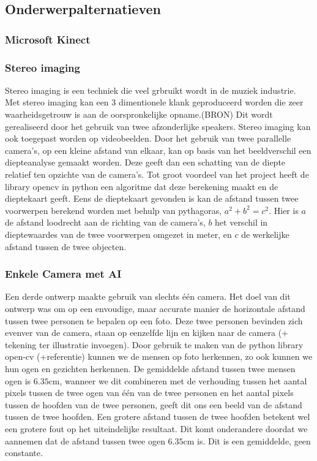 \documentclass[a4paper,11pt]{article}
\begin{document}
	\subsection{Onderwerpalternatieven}
	\subsubsection{Microsoft Kinect}
	\subsubsection{Stereo imaging}
		Stereo imaging is een techniek die veel grbruikt wordt in de muziek industrie. Met stereo imaging kan een 3 dimentionele klank geproduceerd worden die zeer waarheidsgetrouw is aan de oorspronkelijke opname.(BRON) Dit wordt gerealiseerd door het gebruik van twee afzonderlijke speakers. Stereo imaging kan ook toegepast worden op videobeelden. Door het gebruik van twee parallelle camera's, op een kleine afstand van elkaar, kan op basis van het beeldverschil een diepteanalyse gemaakt worden. Deze geeft dan een schatting van de diepte relatief ten opzichte van de camera's. Tot groot voordeel van het project heeft de library opencv in python een algoritme dat deze berekening maakt en de dieptekaart geeft. Eens de dieptekaart gevonden is kan de afstand tussen twee voorwerpen berekend worden met behulp van pythagoras, $a^2+b^2=c^2 $. Hier is $a$ de afstand loodrecht aan de richting van de camera's, $b$ het verschil in dieptewaardes van de twee voorwerpen omgezet in meter, en $c$ de werkelijke afstand tussen de twee objecten.
		
	\subsubsection{Enkele Camera met AI}
		Een derde ontwerp maakte gebruik van slechts één camera. Het doel van dit ontwerp was om op een envoudige, maar accurate manier de horizontale afstand tussen twee personen te bepalen op een foto. Deze twee personen bevinden zich evenver van de camera, staan op eenzelfde lijn en kijken naar de camera (+ tekening ter illustratie invoegen). Door gebruik te maken van de python library open-cv (+referentie) kunnen we de mensen op foto herkennen, zo ook kunnen we hun ogen en gezichten herkennen. De gemiddelde afstand tussen twee mensen ogen is $6.35\text{cm}$, wanneer we dit combineren met de verhouding tussen het aantal pixels tussen de twee ogen van één van de twee personen en het aantal pixels tussen de hoofden van de twee personen, geeft dit ons een beeld van de afstand tussen de twee hoofden. Een grotere afstand tussen de twee hoofden betekent wel een grotere fout op het uiteindelijke resultaat. Dit komt onderandere doordat we aannemen dat de afstand tussen twee ogen $6.35\text{cm}$ is. Dit is een gemiddelde, geen constante.
\end{document}
